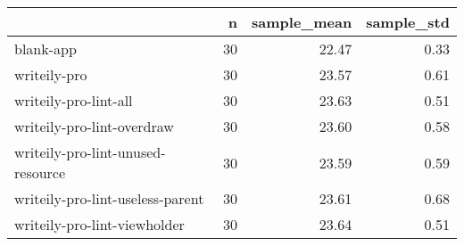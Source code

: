 \begin{tabular}{lrrr}
\toprule
{} &   n &  sample\_mean &  sample\_std \\
\midrule
blank-app                         &  30 &        22.47 &        0.33 \\
writeily-pro                      &  30 &        23.57 &        0.61 \\
writeily-pro-lint-all             &  30 &        23.63 &        0.51 \\
writeily-pro-lint-overdraw        &  30 &        23.60 &        0.58 \\
writeily-pro-lint-unused-resource &  30 &        23.59 &        0.59 \\
writeily-pro-lint-useless-parent  &  30 &        23.61 &        0.68 \\
writeily-pro-lint-viewholder      &  30 &        23.64 &        0.51 \\
\bottomrule
\end{tabular}

